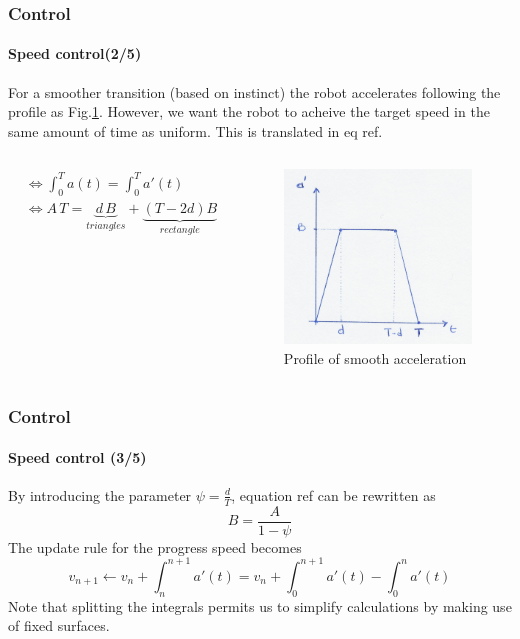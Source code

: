 \documentclass[10pt]{beamer}
\begin{document}
\begin{frame}
\frametitle{Control}
\framesubtitle{Speed control(2/5)}
For a smoother transition (based on instinct) the robot accelerates following the profile as Fig.\ref{fig:smooth-acc}. However, we want the robot to acheive the target speed in the same amount of time as uniform. This is translated in eq ref.
\begin{columns}[c]

\begin{align*}
&\Leftrightarrow \int_{0}^{T}a(t) =  \int_{0}^{T}a'(t) \\
&\Leftrightarrow A\,T = \underbrace{d\,B}_{triangles} + \underbrace{(T - 2d)B}_{rectangle}
\end{align*}

\begin{figure}[hbtp]
\centering
\label{fig:smooth-acc}
\includegraphics[scale=0.07]{figures/smooth-acc}
\caption{Profile of smooth acceleration}
\end{figure}
\end{columns}
\end{frame}


\begin{frame}
\frametitle{Control}
\framesubtitle{Speed control (3/5)}
By introducing the parameter $\psi = \frac{d}{T}$, equation ref can be rewritten as
$$
\boxed{B = \frac{A}{1-\psi}} 
$$
The update rule for the progress speed becomes
$$
v_{n+1} \leftarrow v_n + \int_{n}^{n+1}a'(t) = v_n + \int_{0}^{n+1}a'(t) - \int_{0}^{n}a'(t)
$$
Note that splitting the integrals permits us to simplify calculations by making use of fixed surfaces.
\end{frame}
\end{document}
